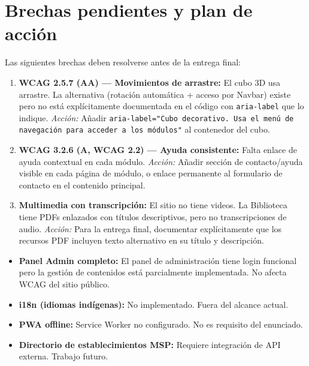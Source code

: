 \documentclass[12pt, a4paper]{article}
\begin{document}
\section{Brechas pendientes y plan de acción}

\begin{warnbox}
Las siguientes brechas deben resolverse antes de la entrega final:
\begin{enumerate}
  \item \textbf{WCAG 2.5.7 (AA) --- Movimientos de arrastre:} El cubo 3D usa arrastre. La alternativa (rotación automática + acceso por Navbar) existe pero no está explícitamente documentada en el código con \texttt{aria-label} que lo indique. \textit{Acción:} Añadir \texttt{aria-label="Cubo decorativo. Usa el menú de navegación para acceder a los módulos"} al contenedor del cubo.
  \item \textbf{WCAG 3.2.6 (A, WCAG 2.2) --- Ayuda consistente:} Falta enlace de ayuda contextual en cada módulo. \textit{Acción:} Añadir sección de contacto/ayuda visible en cada página de módulo, o enlace permanente al formulario de contacto en el contenido principal.
  \item \textbf{Multimedia con transcripción:} El sitio no tiene videos. La Biblioteca tiene PDFs enlazados con títulos descriptivos, pero no transcripciones de audio. \textit{Acción:} Para la entrega final, documentar explícitamente que los recursos PDF incluyen texto alternativo en su título y descripción.
\end{enumerate}
\end{warnbox}

\begin{infobox}
\begin{itemize}
  \item \textbf{Panel Admin completo:} El panel de administración tiene login funcional pero la gestión de contenidos está parcialmente implementada. No afecta WCAG del sitio público.
  \item \textbf{i18n (idiomas indígenas):} No implementado. Fuera del alcance actual.
  \item \textbf{PWA offline:} Service Worker no configurado. No es requisito del enunciado.
  \item \textbf{Directorio de establecimientos MSP:} Requiere integración de API externa. Trabajo futuro.
\end{itemize}
\end{infobox}
\end{document}
